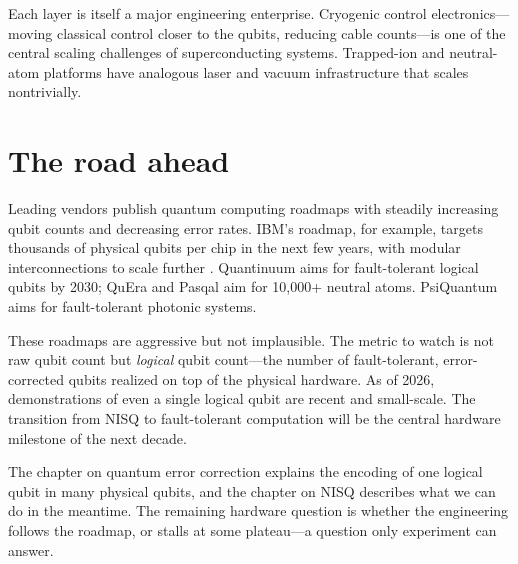 Each layer is itself a major engineering enterprise. Cryogenic control electronics---moving classical control closer to the qubits, reducing cable counts---is one of the central scaling challenges of superconducting systems. Trapped-ion and neutral-atom platforms have analogous laser and vacuum infrastructure that scales nontrivially.

\section{The road ahead}

Leading vendors publish quantum computing roadmaps with steadily increasing qubit counts and decreasing error rates. IBM's roadmap, for example, targets thousands of physical qubits per chip in the next few years, with modular interconnections to scale further \citep{ibm_quantum_2023}. Quantinuum aims for fault-tolerant logical qubits by 2030; QuEra and Pasqal aim for 10,000+ neutral atoms. PsiQuantum aims for fault-tolerant photonic systems.

These roadmaps are aggressive but not implausible. The metric to watch is not raw qubit count but \emph{logical} qubit count---the number of fault-tolerant, error-corrected qubits realized on top of the physical hardware. As of 2026, demonstrations of even a single logical qubit are recent and small-scale. The transition from NISQ to fault-tolerant computation will be the central hardware milestone of the next decade.

The chapter on quantum error correction explains the encoding of one logical qubit in many physical qubits, and the chapter on NISQ describes what we can do in the meantime. The remaining hardware question is whether the engineering follows the roadmap, or stalls at some plateau---a question only experiment can answer.

\textsep
